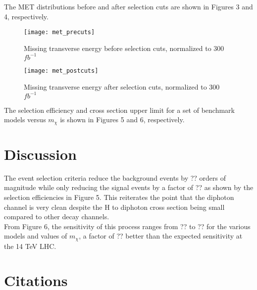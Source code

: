 \documentclass[twoside]{article}
\begin{document}
\begin{multicols}{2}
\indent The MET distributions before and after selection cuts are shown in Figures 3 and 4, respectively. \\

\begin{figure}[H]
\centering
\texttt{[image: met\_precuts]}
\caption{Missing transverse energy before selection cuts, normalized to 300 $fb^{-1}$}
\end{figure}

\begin{figure}[H]
\centering
\texttt{[image: met\_postcuts]}
\caption{Missing transverse energy after selection cuts, normalized to 300 $fb^{-1}$}
\end{figure}

The selection efficiency and cross section upper limit for a set of benchmark models versus $m_{\chi}$ is shown in Figures 5 and 6, respectively. \\


\section{Discussion}

The event selection criteria reduce the background events by ?? orders of magnitude while only reducing the signal events by a factor of ?? as shown by the selection efficiencies in Figure 5. This reiterates the point that the diphoton channel is very clean despite the H to diphoton cross section being small compared to other decay channels. \\
\indent From Figure 6, the sensitivity of this process ranges from ?? to ?? for the various models and values of $m_{\chi}$, a factor of ?? better than the expected sensitivity at the 14 TeV LHC. \\


\section{Citations}



\end{multicols}
\end{document}
